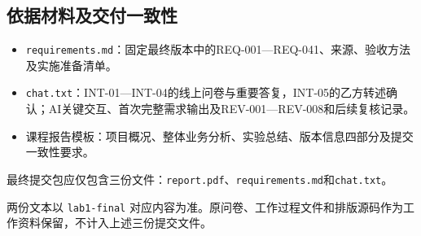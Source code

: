 \documentclass[UTF8,a4paper,11pt,fontset=fandol]{ctexart}
\begin{document}
\subsection{依据材料及交付一致性}
\begin{itemize}
\item \texttt{requirements.md}：固定最终版本中的REQ-001—REQ-041、来源、验收方法及实施准备清单。
\item \texttt{chat.txt}：INT-01—INT-04的线上问卷与重要答复，INT-05的乙方转述确认；AI关键交互、首次完整需求输出及REV-001—REV-008和后续复核记录。
\item 课程报告模板：项目概况、整体业务分析、实验总结、版本信息四部分及提交一致性要求。
\end{itemize}

最终提交包应仅包含三份文件：\texttt{report.pdf}、\texttt{requirements.md}和\texttt{chat.txt}。

两份文本以 \texttt{lab1-final} 对应内容为准。原问卷、工作过程文件和排版源码作为工作资料保留，不计入上述三份提交文件。
\end{document}
